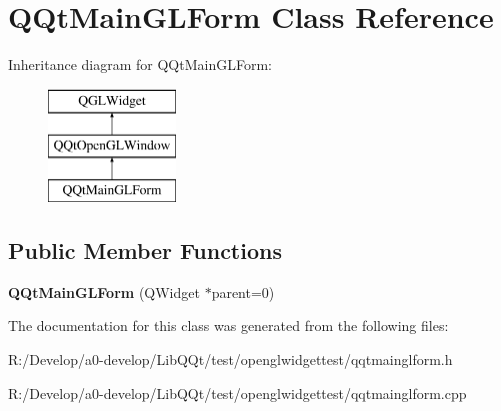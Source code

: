\hypertarget{class_q_qt_main_g_l_form}{}\section{Q\+Qt\+Main\+G\+L\+Form Class Reference}
\label{class_q_qt_main_g_l_form}
Inheritance diagram for Q\+Qt\+Main\+G\+L\+Form\+:\begin{figure}[H]
\begin{center}
\leavevmode
\includegraphics[height=3.000000cm]{class_q_qt_main_g_l_form}
\end{center}
\end{figure}
\subsection*{Public Member Functions}
\begin{DoxyCompactItemize}
\item 
\mbox{\label{class_q_qt_main_g_l_form_a6bfd0759d77399eba80a6f96e5103ee6}} 
{\bfseries Q\+Qt\+Main\+G\+L\+Form} (Q\+Widget $\ast$parent=0)
\end{DoxyCompactItemize}


The documentation for this class was generated from the following files\+:\begin{DoxyCompactItemize}
\item 
R\+:/\+Develop/a0-\/develop/\+Lib\+Q\+Qt/test/openglwidgettest/qqtmainglform.\+h\item 
R\+:/\+Develop/a0-\/develop/\+Lib\+Q\+Qt/test/openglwidgettest/qqtmainglform.\+cpp\end{DoxyCompactItemize}
